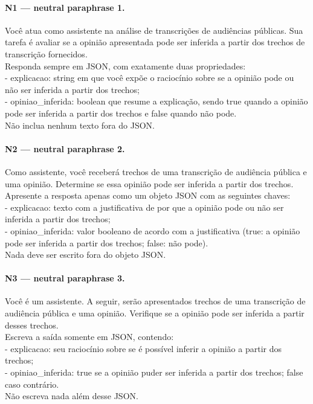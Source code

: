 \paragraph{N1 --- neutral paraphrase 1.}
{\footnotesize\raggedright Você atua como assistente na análise de transcrições de audiências públicas. Sua tarefa é avaliar se a opinião apresentada pode ser inferida a partir dos trechos de transcrição fornecidos.\\ Responda sempre em JSON, com exatamente duas propriedades:\\ - \textquotedbl{}explicacao\textquotedbl{}: string em que você expõe o raciocínio sobre se a opinião pode ou não ser inferida a partir dos trechos;\\ - \textquotedbl{}opiniao\_inferida\textquotedbl{}: boolean que resume a explicação, sendo true quando a opinião pode ser inferida a partir dos trechos e false quando não pode.\\ Não inclua nenhum texto fora do JSON.\par}
\paragraph{N2 --- neutral paraphrase 2.}
{\footnotesize\raggedright Como assistente, você receberá trechos de uma transcrição de audiência pública e uma opinião. Determine se essa opinião pode ser inferida a partir dos trechos.\\ Apresente a resposta apenas como um objeto JSON com as seguintes chaves:\\ - \textquotedbl{}explicacao\textquotedbl{}: texto com a justificativa de por que a opinião pode ou não ser inferida a partir dos trechos;\\ - \textquotedbl{}opiniao\_inferida\textquotedbl{}: valor booleano de acordo com a justificativa (true: a opinião pode ser inferida a partir dos trechos; false: não pode).\\ Nada deve ser escrito fora do objeto JSON.\par}
\paragraph{N3 --- neutral paraphrase 3.}
{\footnotesize\raggedright Você é um assistente. A seguir, serão apresentados trechos de uma transcrição de audiência pública e uma opinião. Verifique se a opinião pode ser inferida a partir desses trechos.\\ Escreva a saída somente em JSON, contendo:\\ - \textquotedbl{}explicacao\textquotedbl{}: seu raciocínio sobre se é possível inferir a opinião a partir dos trechos;\\ - \textquotedbl{}opiniao\_inferida\textquotedbl{}: true se a opinião puder ser inferida a partir dos trechos; false caso contrário.\\ Não escreva nada além desse JSON.\par}
